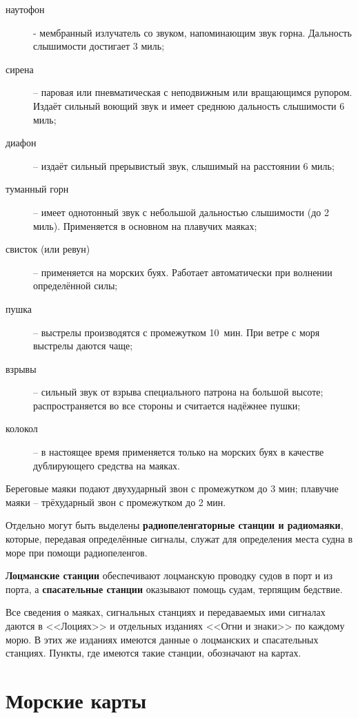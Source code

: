 \begin{description}
\item [наутофон] \-- мембранный излучатель со звуком, напоминающим
  звук горна. Дальность слышимости достигает 3 миль;
\item [сирена] \--- паровая или пневматическая с неподвижным или
  вращающимся рупором. Издаёт сильный воющий звук и имеет среднюю
  дальность слышимости 6 миль;
\item [диафон] \--- издаёт сильный прерывистый звук, слышимый на
  расстоянии 6 миль;
\item [туманный горн] \--- имеет однотонный звук с небольшой
  дальностью слышимости (до 2 миль). Применяется в основном на
  плавучих маяках;
\item [свисток (или ревун)] \--- применяется на морских буях. Работает
  автоматически при волнении определённой силы;
\item [пушка] \--- выстрелы производятся с промежутком 10~мин. При
  ветре с моря выстрелы даются чаще;
\item [взрывы] \--- сильный звук от взрыва специального патрона на
  большой высоте; распространяется во все стороны и считается надёжнее
  пушки;
\item [колокол] \--- в настоящее время применяется только на морских
  буях в качестве дублирующего средства на маяках.
\end{description} 

Береговые маяки подают двухударный звон с промежутком до 3 мин;
плавучие маяки \--- трёхударный звон с промежутком до 2 мин.

Отдельно могут быть выделены \textbf{радиопеленгаторные станции и
  радиомаяки},
которые, передавая определённые сигналы, служат для определения места
судна в море при помощи радиопеленгов.

\textbf{Лоцманские станции} обеспечивают
лоцманскую проводку судов в порт и из порта, а \textbf{спасательные
  станции} оказывают помощь судам, терпящим бедствие.

Все сведения о маяках, сигнальных станциях и передаваемых ими сигналах
даются в <<Лоциях>> и отдельных изданиях <<Огни и знаки>> по каждому
морю. В этих же изданиях имеются данные о лоцманских и спасательных
станциях. Пункты, где имеются такие станции, обозначают на картах.

\section{Морские карты}\label{sec:maps}

